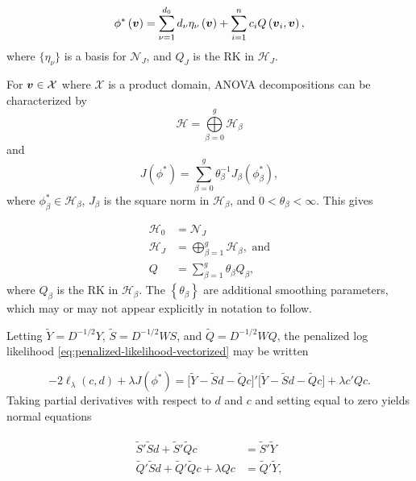 \documentclass[12pt]{article}
\newcommand{\Hilbert}{\mathcal{H}}
\newcommand{\tildeY}{\tilde{Y}}
\newcommand{\tildeQ}{\tilde{Q}}
\newcommand{\tildeS}{\tilde{S}}
\newcommand{\bfv}{\mbox{\boldmath $v$}}
\theoremstyle{definition}
\begin{document}
\begin{equation} \label{eq:RKHS-functional-form}
\phi^*\left(\bfv\right) = \sum_{\nu = 1}^{d_0} d_\nu \eta_\nu\left( \bfv \right) + \sum_{i=1}^n c_i Q\left(\bfv_i, \bfv \right),
\end{equation} 
\bigskip
\noindent
where $\lbrace \eta_\nu \rbrace$ is a basis for $\mathcal{N}_J$, and $Q_J$ is the RK in $\Hilbert_J$. 

\bigskip

For $\bfv \in \mathcal{X}$ where $\mathcal{X}$ is a product domain, ANOVA decompositions can be characterized by 
\begin{equation*}
\Hilbert = \bigoplus\limits_{\beta=0}^{g} \Hilbert_\beta
\end{equation*}
\noindent
and
\begin{equation*}
J\left(\phi^*\right) = \sum_{\beta=0}^{g} \theta^{-1}_\beta J_\beta \left( \phi^*_\beta \right),
\end{equation*}
\noindent
where $\phi^*_\beta \in \Hilbert_\beta$, $J_\beta$ is the square norm in $\Hilbert_\beta$, and $0 < \theta_\beta < \infty$. This gives 

\begin{align*}
\Hilbert_0 &= \mathcal{N}_J \\
\Hilbert_J &= \bigoplus\limits_{\beta=1}^{g} \Hilbert_\beta, \mbox{ and} \\
Q &= \sum_{\beta=1}^g \theta_\beta Q_\beta,
\end{align*}
\noindent
where $Q_\beta$ is the RK in $\Hilbert_\beta$. The $\left \{ \theta_\beta \right\}$ are additional smoothing parameters, which may or may not appear explicitly in notation to follow. 

\bigskip

Letting $\tildeY = D^{-1/2} Y$, $\tildeS = D^{-1/2} W S$, and $\tildeQ = D^{-1/2} W Q$, the penalized log likelihood \ref{eq:penalized-likelihood-vectorized} may be written

\begin{equation}\label{eq:penalized-loglik-tilde-vectorized}
-2\ell_\lambda \left(c, d \right) + \lambda J\left( \phi^* \right) = \bigg[ \tildeY - \tildeS d - \tildeQ c\bigg]'\bigg[ \tildeY - \tildeS d - \tildeQ c\bigg] + \lambda c'Qc.
\end{equation}
\noindent
Taking partial derivatives with respect to $d$ and $c$ and setting equal to zero yields normal equations 

\begin{align}
\begin{split}
\tildeS'\tildeS d + \tildeS'\tildeQ c &= \tildeS' \tildeY \\
\tildeQ'\tildeS d + \tildeQ'\tildeQ c + \lambda Q c &= \tildeQ' \tildeY, 
\end{split}
\end{align}
\end{document}
